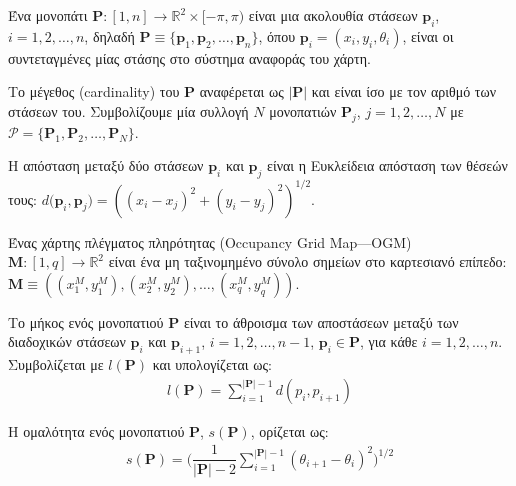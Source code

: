 \begin{bw_box}
\begin{definition}
Ένα μονοπάτι $\bm{P} : [1,n] \rightarrow \mathbb{R}^2 \times [-\pi, \pi)$ είναι
μια ακολουθία στάσεων $\bm{p}_i$, $i = 1,2,\dots,n$, δηλαδή
$\bm{P} \equiv \{\bm{p}_1, \bm{p}_2, \dots, \bm{p}_n\}$, όπου
$\bm{p}_i = (x_i, y_i, \theta_i)$, είναι οι συντεταγμένες μίας στάσης στο
σύστημα αναφοράς του χάρτη.
\end{definition}
\end{bw_box}

Το μέγεθος (cardinality) του $\bm{P}$ αναφέρεται ως $|\bm{P}|$ και είναι ίσο με
τον αριθμό των στάσεων του. Συμβολίζουμε μία συλλογή $N$ μονοπατιών $\bm{P}_j$,
$j = 1,2,\dots,N$ με $\bm{\mathcal{P}} = \{\bm{P}_1, \bm{P}_2, \dots,
\bm{P}_N\}$.

\begin{bw_box}
\begin{definition}
Η απόσταση μεταξύ δύο στάσεων $\bm{p}_i$ και $\bm{p}_j$ είναι η
Ευκλείδεια απόσταση των θέσεών τους:
$d\bm{(p}_i,\bm{p}_j) = ((x_i - x_j)^2 + (y_i - y_j)^2)^{1/2}$.
\end{definition}
\end{bw_box}

\begin{bw_box}
\begin{definition}
Ένας χάρτης πλέγματος πληρότητας (Occupancy Grid Map---OGM)
$\bm{M} : [1, q] \rightarrow \mathbb{R}^2$ είναι ένα
μη ταξινομημένο σύνολο σημείων στο καρτεσιανό επίπεδο:
$\bm{M} \equiv ((x_1^M, y_1^M), (x_2^M, y_2^M), \dots, (x_q^M, y_q^M) )$.
\end{definition}
\end{bw_box}

\begin{bw_box}
\begin{definition}
Το μήκος ενός μονοπατιού $\bm{P}$ είναι το άθροισμα των αποστάσεων μεταξύ των
διαδοχικών στάσεων $\bm{p}_i$ και $\bm{p}_{i+1}$, $i = 1,2,\dots,n-1$,
$\bm{p}_i \in \bm{P}$, για κάθε $i = 1,2,\dots,n$. Συμβολίζεται με $l(\bm{P})$
και υπολογίζεται ως:
\begin{align}
  l(\bm{P}) = \sum\limits_{i=1}^{|\bm{P}|-1} d(p_i, p_{i+1})
  \label{eq:path_length}
\end{align}
\end{definition}
\end{bw_box}

\begin{bw_box}
\begin{definition}
Η ομαλότητα ενός μονοπατιού $\bm{P}$, $s(\bm{P})$, ορίζεται ως:
\begin{align}
  s(\bm{P}) = \Big(\dfrac{1}{|\bm{P}|-2}\sum\limits_{i=1}^{|\bm{P}|-1} (\theta_{i+1} - \theta_i)^2\Big)^{1/2}
  \label{eq:path_smoothness}
\end{align}
\end{definition}
\end{bw_box}

